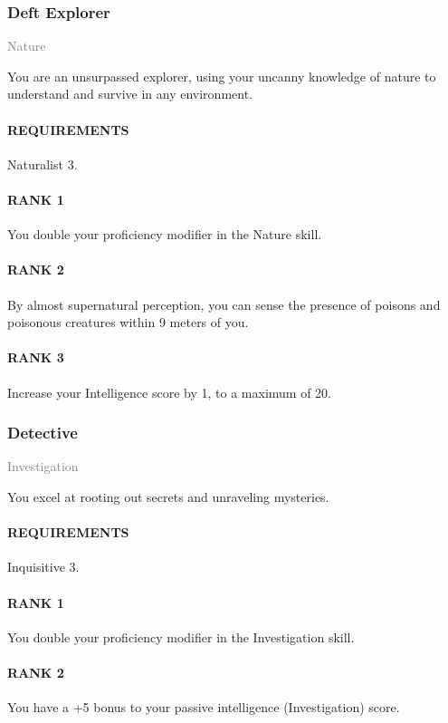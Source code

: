\subsubsection{Deft Explorer} \label{feat::deftexplorer}
\small{\textcolor{gray}{Nature}}

\normalsize
You are an unsurpassed explorer, using your uncanny knowledge of nature to understand and survive in any environment.
\paragraph{REQUIREMENTS} Naturalist 3.
\paragraph{RANK 1} You double your proficiency modifier in the Nature skill.
\paragraph{RANK 2} By almost supernatural perception, you can sense the presence of poisons and poisonous creatures within 9 meters of you.
\paragraph{RANK 3} Increase your Intelligence score by 1, to a maximum of 20.

\subsubsection{Detective} \label{feat::detective}
\small{\textcolor{gray}{Investigation}}

\normalsize
You excel at rooting out secrets and unraveling mysteries.
\paragraph{REQUIREMENTS} Inquisitive 3.
\paragraph{RANK 1} You double your proficiency modifier in the Investigation skill.
\paragraph{RANK 2} You have a +5 bonus to your passive intelligence (Investigation) score.

